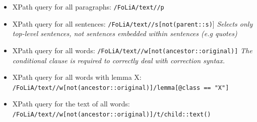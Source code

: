 \documentclass[a4paper,12pt]{report}
\begin{document}
\begin{itemize}
\item XPath query for all paragraphs: \texttt{/FoLiA/text//p}
\item XPath query for all sentences: \texttt{/FoLiA/text//s[not(parent::s)}] \emph{Selects only top-level sentences, not sentences embedded within sentences (e.g quotes)}
\item XPath query for all words: \texttt{/FoLiA/text//w[not(ancestor::original)]} \emph{The conditional clause is required to correctly deal with correction syntax.}
\item XPath query for all words with lemma X: \\ \texttt{/FoLiA/text//w[not(ancestor::original)]/lemma[@class == "X"]}
\item XPath query for the text of all words: \\ \texttt{/FoLiA/text//w[not(ancestor::original)]/t/child::text()}
\end{itemize}






\end{document}
